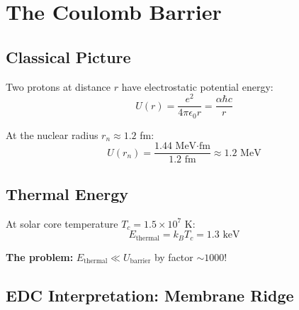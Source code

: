 \documentclass[12pt,a4paper]{article}
\newcommand{\kB}{k_B}
\begin{document}

\section{The Coulomb Barrier}

\subsection{Classical Picture}

Two protons at distance $r$ have electrostatic potential energy:
\begin{equation}
U(r) = \frac{e^2}{4\pi\epsilon_0 r} = \frac{\alpha \hbar c}{r}
\end{equation}

At the nuclear radius $r_n \approx 1.2$ fm:
\begin{equation}
U(r_n) = \frac{1.44 \text{ MeV·fm}}{1.2 \text{ fm}} \approx 1.2 \text{ MeV}
\end{equation}

\subsection{Thermal Energy}

At solar core temperature $T_c = 1.5 \times 10^7$ K:
\begin{equation}
E_{\text{thermal}} = \kB T_c = 1.3 \text{ keV}
\end{equation}

\textbf{The problem:} $E_{\text{thermal}} \ll U_{\text{barrier}}$ by factor $\sim 1000$!

\subsection{EDC Interpretation: Membrane Ridge}
\end{document}
